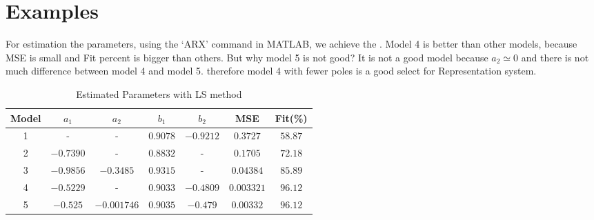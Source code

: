 \section{Examples} {

}
For estimation the parameters, using the `ARX' command in MATLAB, we achieve the .
Model 4 is better than other models, because MSE is small and Fit percent is bigger than others.
But why model 5 is not good? It is not a good model because $a_2\simeq 0$ and there is not much difference between model 4 and model 5.
therefore model 4 with fewer poles is a good select for Representation system.
\begin{table}[h!]
    \begin{center}
        \caption{Estimated Parameters with LS method}
        \label{tab.est}
        \begin{tabular}{c|c|c|c|c|c|c}
            Model &  $a_1$ & $a_2$ & $b_1$ & $b_2$ & MSE & Fit(\%)\\
            \hline
            1 & - & - & $0.9078$ & $-0.9212$ & $0.3727$ & $58.87$ \\
            2 & $-0.7390$ & - & $0.8832$ & - & $0.1705$ & $72.18$\\
            3 & $-0.9856$ & $-0.3485$ & $0.9315$ & - & $0.04384$ & $85.89$\\
            4 & $-0.5229$ & - & $0.9033$ & $-0.4809$ & $0.003321$ & $96.12$\\
            5 & $-0.525$ & $-0.001746$ & $0.9035$ & $-0.479$ & $0.00332$ & $96.12$\\
        \end{tabular}
    \end{center}
\end{table}